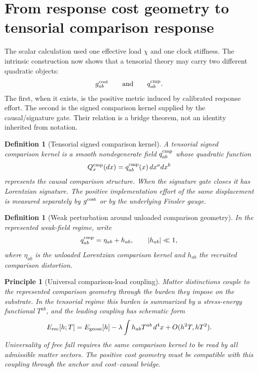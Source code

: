 \documentclass[11pt]{article}
\newtheorem{definition}[theorem]{Definition}
\newtheorem{principle}[theorem]{Principle}
\theoremstyle{remark}
\newcommand{\Erec}{E_{\rm rec}}
\newcommand{\Egeom}{E_{\rm geom}}
\newcommand{\Gcost}{g^{\rm cost}}
\newcommand{\Qcmp}{Q^{\rm cmp}}
\begin{document}
\section{From response cost geometry to tensorial comparison response}
\label{sec:tensorial-response}

The scalar calculation used one effective load $\chi$ and one clock stiffness.  The intrinsic construction now shows that a tensorial theory may carry two different quadratic objects:
\[
        \Gcost_{ab}
        \qquad\text{and}\qquad
        q^{\rm cmp}_{ab}.
\]
The first, when it exists, is the positive metric induced by calibrated response effort.  The second is the signed comparison kernel supplied by the causal/signature gate.  Their relation is a bridge theorem, not an identity inherited from notation.

\begin{definition}[Tensorial signed comparison kernel]
A tensorial signed comparison kernel is a smooth nondegenerate field $q^{\rm cmp}_{ab}$ whose quadratic function
\[
        \Qcmp_x(dx)=q^{\rm cmp}_{ab}(x)\,dx^a dx^b
\]
represents the causal comparison structure.  When the signature gate closes it has Lorentzian signature.  The positive implementation effort of the same displacement is measured separately by $\Gcost$ or by the underlying Finsler gauge.
\end{definition}

\begin{definition}[Weak perturbation around unloaded comparison geometry]
In the represented weak-field regime, write
\[
        q^{\rm cmp}_{ab}=\eta_{ab}+h_{ab},
        \qquad |h_{ab}|\ll1,
\]
where $\eta_{ab}$ is the unloaded Lorentzian comparison kernel and $h_{ab}$ the recruited comparison distortion.
\end{definition}

\begin{principle}[Universal comparison-load coupling]
Matter distinctions couple to the represented comparison geometry through the burden they impose on the substrate.  In the tensorial regime this burden is summarized by a stress-energy functional $T^{ab}$, and the leading coupling has schematic form
\[
        \Erec[h;T]
        =\Egeom[h]-\lambda\int h_{ab}T^{ab}\,d^4x
        +O(h^2T,hT^2).
\]
Universality of free fall requires the same comparison kernel to be read by all admissible matter sectors.  The positive cost geometry must be compatible with this coupling through the anchor and cost--causal bridge.
\end{principle}
\end{document}
